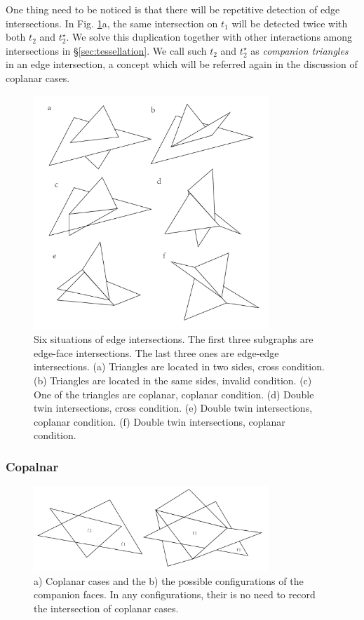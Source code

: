 \documentclass[10pt,journal,compsoc]{IEEEtran}
\begin{document}
One thing need to be noticed is that there will be repetitive detection of edge intersections. In Fig. \ref{fig:twin}a, the same intersection on $t_1$ will be detected twice with both $t_2$ and $t_2^{\star}$. We solve this duplication together with other interactions among intersections in \S\ref{sec:tessellation}. We call such $t_2$ and $t_2^{\star}$ as \emph{companion triangles} in an edge intersection, a concept which will be referred again in the discussion of coplanar cases.

\begin{figure}[t]
\centering
\includegraphics[width=3.5in]{twin}
\caption{Six situations of edge intersections. The first three subgraphs are edge-face intersections. The last three ones are edge-edge intersections. (a) Triangles are located in two sides, cross condition. (b) Triangles are located in the same sides, invalid condition. (c) One of the triangles are coplanar, coplanar condition. (d) Double twin intersections, cross condition. (e) Double twin intersections, coplanar condition. (f) Double twin intersections, coplanar condition.}
\label{fig:twin}
\end{figure}


\subsubsection{Copalnar}

\begin{figure}[t]
\centering
\includegraphics[width=3.5in]{coplanar}
\caption{a) Coplanar cases and the b) the possible configurations of the companion faces. In any configurations, their is no need to record the intersection of coplanar cases.}
\label{fig:coplanar}
\end{figure}
\end{document}
